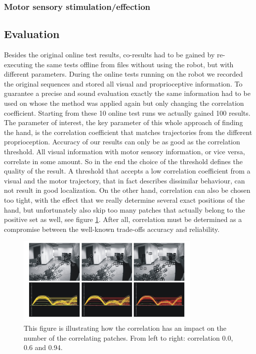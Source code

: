 \documentclass[conference]{IEEEtran}
\begin{document}
\subsubsection{Motor sensory stimulation/effection}\label{results:motosensstim}

%
%
\subsection{Evaluation}\label{results:evaluation}
Besides the original online test results, co-results had to be gained by re-executing the same tests offline from files without using the robot, but with different parameters. During the online tests running on the robot we recorded the original sequences and stored all visual and proprioceptive information. To guarantee a precise and sound evaluation exactly the same information had to be used on whose the method was applied again but only changing the correlation coefficient. Starting from these 10 online test runs we actually gained 100 results. The parameter of interest, the key parameter of this whole approach of finding the hand, is the correlation coefficient that matches trajectories from the different proprioception. Accuracy of our results can only be as good as the correlation threshold. All visual information with motor sensory information, or vice versa, correlate in some amount. So in the end the choice of the threshold defines the quality of the result. A threshold that accepts a low correlation coefficient from a visual and the motor trajectory, that in fact describes dissimilar behaviour, can not result in good localization. On the other hand, correlation can also be chosen too tight, with the effect that we really determine several exact positions of the hand, but unfortunately also skip too many patches that actually belong to the positive set as well, see figure \ref{fig:impactofcorr}. After all, correlation must be determined as a compromise between the well-known trade-offs accuracy and reliability.
%
\begin{figure}
	\begin{center}
		\includegraphics[width=3.5in]{imgs/results/impactofcorr.pdf}
			\caption[Varying the correlation threshold.]{ This figure is illustrating how the correlation has an impact on the number of the correlating patches. From left to right: correlation 0.0, 0.6 and 0.94. }
			\label{fig:impactofcorr}
	\end{center}
\end{figure}
%
\end{document}
